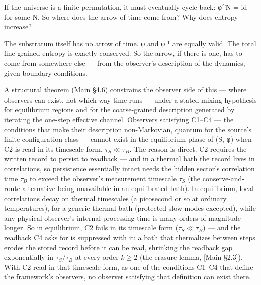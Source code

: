 \documentclass[
]{article}
\begin{document}
If the universe is a finite permutation, it must eventually cycle back:
φ\^{}N = id for some N. So where does the arrow of time come from? Why
does entropy increase?

The substratum itself has no arrow of time. φ and φ⁻¹ are equally valid.
The total fine-grained entropy is exactly conserved. So the arrow, if
there is one, has to come from somewhere else --- from the observer's
description of the dynamics, given boundary conditions.

A structural theorem (Main §4.6) constrains the observer side of this
--- where observers can exist, not which way time runs --- under a
stated mixing hypothesis for equilibrium regions and for the
coarse-grained description generated by iterating the one-step effective
channel. Observers satisfying C1--C4 --- the conditions that make their
description non-Markovian, quantum for the source's finite-configuration
class --- cannot exist in the equilibrium phase of (S, φ) when C2 is
read in its timescale form, \(\tau_S \ll \tau_B\). The reason is direct.
C2 requires the written record to persist to readback --- and in a
thermal bath the record lives in correlations, so persistence
essentially intact needs the hidden sector's correlation time \(\tau_B\)
to exceed the observer's measurement timescale \(\tau_S\) (the
conserve-and-route alternative being unavailable in an equilibrated
bath). In equilibrium, local correlations decay on thermal timescales (a
picosecond or so at ordinary temperatures), for a generic thermal bath
(protected slow modes excepted), while any physical observer's internal
processing time is many orders of magnitude longer. So in equilibrium,
C2 fails in its timescale form (\(\tau_S \ll \tau_B\)) --- and the
readback C4 asks for is suppressed with it: a bath that thermalizes
between steps erodes the stored record before it can be read, shrinking
the readback gap exponentially in \(\tau_S/\tau_B\) at every order
\(k \geq 2\) (the erasure lemma, {[}Main §2.3{]}). With C2 read in that
timescale form, as one of the conditions C1--C4 that define the
framework's observers, no observer satisfying that definition can exist
there.
\end{document}
